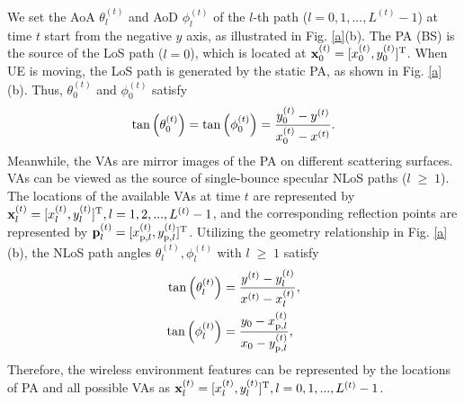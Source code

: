 \documentclass[journal,12pt,onecolumn,draftclsnofoot,]{IEEEtran}
\begin{document}
We set the AoA ${\theta _l^{(t)}}$ and AoD ${\phi _l^{(t)}}$ of the $l$-th path ($ l=0,1,..., {L^{(t)}}-1$) at time $t$ start from the negative $y$ axis, as illustrated in Fig. \ref{a}(b).
The PA (BS) is the source of the LoS path ($l=0$), which is located at $\mathbf{x}_0^{(t)}={[ {{x_0^{(t)}},{y_0^{(t)}}} ]^{\rm T}}$. When UE is moving, the LoS path is generated by the static PA, as shown in Fig. \ref{a}(b). 
Thus, ${\theta _0^{(t)}}$ and ${\phi _0^{(t)}}$ satisfy
\vspace{-2mm}
\begin{equation}
{\rm{tan}}\left( \theta _0^{(t)} \right) = {\rm{tan}}\left( \phi _0^{(t)} \right)={\frac{{{y_0^{(t)}} - y^{(t)}}}{{{x_0^{(t)}} - x^{(t)}}}}.
\end{equation}
Meanwhile, the VAs are mirror images of the PA on different scattering surfaces. VAs can be viewed as the source of single-bounce specular NLoS paths ($l\;\ge\;1$). 
The locations of the available VAs at time $t$ are represented by $\mathbf{x}_l^{(t)}={[ {{x_l^{(t)}},{y_l^{(t)}}} ]^{\rm T}}, l=1,2,..., {L^{(t)}}-1$, and the corresponding reflection points are represented by $\mathbf{p}_l^{(t)}={[ {{x_{{\rm p},l}^{(t)}},{y_{{\rm p},l}^{(t)}}} ]^{\rm T}}$. 
Utilizing the geometry relationship in Fig. \ref{a}(b), the NLoS path angles ${\theta _l^{(t)}},{\phi _l^{(t)}}$ with $l\;\ge\;1$ satisfy
\vspace{-2mm}
\begin{subequations}
\label{4}
\begin{align}
{\rm{tan}}\left( \theta _l^{(t)} \right) &= {\frac{{{y^{\left(t \right)}} - y_l^{(t)}}}{{{x^{\left(t \right)}} - x_l^{(t)}}}},\\ 
{\rm{tan}}\left( \phi _l^{(t)} \right)&= {\frac{{{y_0} - x_{{\rm p},l}^{(t)}}}{{{x_0} - y_{{\rm p},l}^{(t)}}}},
\end{align}
\end{subequations}
Therefore, the wireless environment features can be represented by the locations of PA and all possible VAs as $\mathbf{x}_l^{(t)}={[ {{x_l^{(t)}},{y_l^{(t)}}} ]^{\rm T}}, l=0,1,..., {L^{(t)}}-1$. 
\vspace{-3.5mm}
\end{document}
